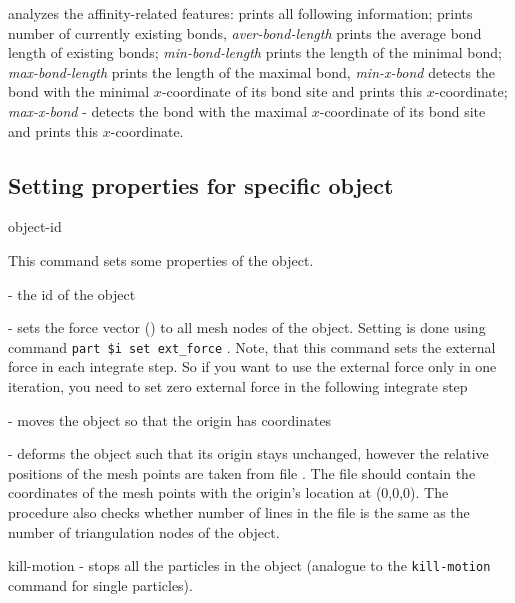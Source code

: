 \begin{arguments}
\item[\opt{affinity \var{name}}] analyzes the affinity-related features:  prints all following information;  prints number of currently existing bonds, \textit{aver-bond-length} prints the average bond length of existing bonds; \textit{min-bond-length} prints the length of the minimal bond; \textit{max-bond-length} prints the length of the maximal bond, \textit{min-x-bond} detects the bond with the minimal $x$-coordinate of its bond site and prints this $x$-coordinate; \textit{max-x-bond} - detects the bond with the maximal $x$-coordinate of its bond site and prints this $x$-coordinate.
\end{arguments} 

\subsection{\label{ssec:oif-object-set}Setting properties for specific object}

\begin{essyntax}
  object-id  
  \begin{features}
  \end{features}
\end{essyntax}

This command sets some properties of the object.

\begin{arguments}
\item[\var{oid}] - the id of the object
\item[\opt{force \var{x} \var{y} \var{z}}] - sets the force vector () to all mesh nodes of the object. Setting is done using \es command \verb|part $i set ext_force|   . Note, that this command sets the external force in each integrate step. So if you want to use the external force only in one iteration, you need to set zero external force in the following integrate step
\item[\opt{origin \var{x} \var{y} \var{z}}] - moves the object so that the origin has coordinates 
\item[\opt{mesh-nodes \var{mesh\_nodes.dat}}] - deforms the object such that its origin stays unchanged, however the relative positions of the mesh points are taken from file . The file  should contain the coordinates of the mesh points with the origin's location at (0,0,0). The procedure also checks whether number of lines in the  file is the same as the number of triangulation nodes of the object.
\item[kill-motion] - stops all the particles in the object (analogue to the \verb|kill-motion| command for single particles).
\end{arguments} 


